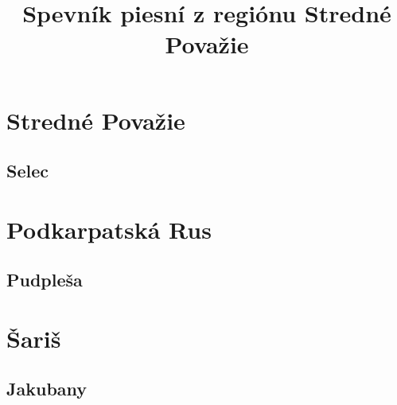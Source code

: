 \documentclass[a4paper]{book}
\title{Spevník piesní z regiónu Stredné Považie}
\begin{document}
\maketitle
\begin{center}

\chapter*{Stredné Považie}
\section*{Selec}
{%
\parindent 0pt
\noindent
\ifx\preLilyPondExample \undefined
\else
  \expandafter\preLilyPondExample
\fi
\def\lilypondbook{}%

\ifx\postLilyPondExample \undefined
\else
  \expandafter\postLilyPondExample
\fi
}
{%
\parindent 0pt
\noindent
\ifx\preLilyPondExample \undefined
\else
  \expandafter\preLilyPondExample
\fi
\def\lilypondbook{}%

\ifx\postLilyPondExample \undefined
\else
  \expandafter\postLilyPondExample
\fi
}
{%
\parindent 0pt
\noindent
\ifx\preLilyPondExample \undefined
\else
  \expandafter\preLilyPondExample
\fi
\def\lilypondbook{}%

\ifx\postLilyPondExample \undefined
\else
  \expandafter\postLilyPondExample
\fi
}
{%
\parindent 0pt
\noindent
\ifx\preLilyPondExample \undefined
\else
  \expandafter\preLilyPondExample
\fi
\def\lilypondbook{}%

\ifx\postLilyPondExample \undefined
\else
  \expandafter\postLilyPondExample
\fi
}
{%
\parindent 0pt
\noindent
\ifx\preLilyPondExample \undefined
\else
  \expandafter\preLilyPondExample
\fi
\def\lilypondbook{}%

\ifx\postLilyPondExample \undefined
\else
  \expandafter\postLilyPondExample
\fi
}

\chapter*{Podkarpatská Rus}
\section*{Pudpleša}
{%
\parindent 0pt
\noindent
\ifx\preLilyPondExample \undefined
\else
  \expandafter\preLilyPondExample
\fi
\def\lilypondbook{}%

\ifx\postLilyPondExample \undefined
\else
  \expandafter\postLilyPondExample
\fi
}
{%
\parindent 0pt
\noindent
\ifx\preLilyPondExample \undefined
\else
  \expandafter\preLilyPondExample
\fi
\def\lilypondbook{}%

\ifx\postLilyPondExample \undefined
\else
  \expandafter\postLilyPondExample
\fi
}

\chapter*{Šariš}
\section*{Jakubany}
{%
\parindent 0pt
\noindent
\ifx\preLilyPondExample \undefined
\else
  \expandafter\preLilyPondExample
\fi
\def\lilypondbook{}%

\ifx\postLilyPondExample \undefined
\else
  \expandafter\postLilyPondExample
\fi
}


\end{center}
\end{document}
